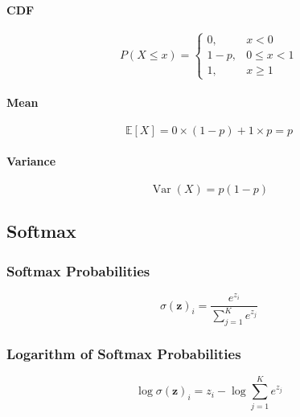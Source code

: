 \documentclass{article}
\begin{document}
\paragraph{CDF}
\label{para:prob-stat:dist:bern:cdf}
\begin{equation}
    \label{eq:bern-cdf}
    P(X \le x) =
    \begin{cases}
        0, & x < 0 \\
        1-p, & 0 \le x < 1 \\
        1, & x \ge 1
    \end{cases}
\end{equation}

\paragraph{Mean}\label{para:prob-stat:dist:bern:mean}
\begin{equation}
    \label{eq:bern-mean}
    \mathbb{E}[X] = 0 \times (1 - p) + 1 \times p = p
\end{equation}

\paragraph{Variance}
\label{para:prob-stat:dist:bern:variance}
\begin{equation}
    \label{eq:bern-variance}
    \operatorname{Var}(X) = p (1-p)
\end{equation}

\subsection{Softmax}\label{subsec:prob-stat:softmax}
\subsubsection{Softmax Probabilities}\label{subsubsec:prob-stat:softmax:prob}
\begin{equation}
    \label{eq:softmax}
    \sigma(\mathbf{z})_i = \frac{e^{z_i}}{\sum_{j=1}^{K} e^{z_j}}
\end{equation}

\subsubsection{Logarithm of Softmax Probabilities}\label{subsubsec:prob-stat:softmax:log}
\begin{equation}
    \label{eq:log-softmax}
    \log \sigma(\mathbf{z})_i = z_i - \log \sum_{j=1}^{K} e^{z_j}
\end{equation}
\end{document}
